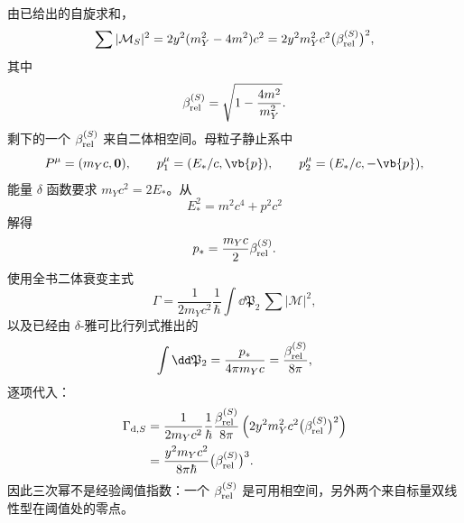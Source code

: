 \begin{exbox}[标量 Yukawa 衰变]
由已给出的自旋求和，
\begin{equation*}
\sum|\mathcal M_S|^2
=2y^2(m_Y^2-4m^2)c^2
=2y^2m_Y^2c^2\bigl(\beta_{\rm rel}^{(S)}\bigr)^2,
\end{equation*}
其中
\begin{equation*}
\beta_{\rm rel}^{(S)}=\sqrt{1-\frac{4m^2}{m_Y^2}}.
\end{equation*}
剩下的一个 $\beta_{\rm rel}^{(S)}$ 来自二体相空间。母粒子静止系中
\begin{equation*}
P^\mu=(m_Yc,\mathbf0),
\qquad
p_1^\mu=(E_*/c,\vb{p}),
\qquad
p_2^\mu=(E_*/c,-\vb{p}),
\end{equation*}
能量 \(\delta\) 函数要求 $m_Yc^2=2E_*$。从
\begin{equation*}
E_*^2=m^2c^4+p^2c^2
\end{equation*}
解得
\begin{equation*}
p_*=\frac{m_Yc}{2}\beta_{\rm rel}^{(S)}.
\end{equation*}
使用全书二体衰变主式
\begin{equation*}
\Gamma
=\frac{1}{2m_Yc^2}\frac{1}{\hbar}
\int\dd\mathfrak P_2\,\sum|\mathcal M|^2,
\end{equation*}
以及已经由 $\delta$-雅可比行列式推出的
\begin{equation*}
\int\dd\mathfrak P_2
=\frac{p_*}{4\pi m_Yc}
=\frac{\beta_{\rm rel}^{(S)}}{8\pi},
\end{equation*}
逐项代入：
\begin{align*}
\Gamma_{{\rm d},S}
&=\frac{1}{2m_Yc^2}\frac1\hbar
\frac{\beta_{\rm rel}^{(S)}}{8\pi}
\left(2y^2m_Y^2c^2\bigl(\beta_{\rm rel}^{(S)}\bigr)^2\right)\\
&=\frac{y^2m_Yc^2}{8\pi\hbar}\bigl(\beta_{\rm rel}^{(S)}\bigr)^3.
\end{align*}
因此三次幂不是经验阈值指数：一个 $\beta_{\rm rel}^{(S)}$ 是可用相空间，另外两个来自标量双线性型在阈值处的零点。
\end{exbox}

